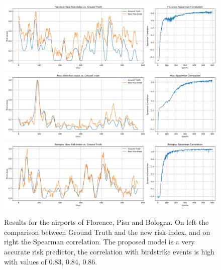 \begin{figure}
	\centering
	\includegraphics[width=14cm]{img/FI.png}	\includegraphics[width=14cm]{img/PSA.png}
	\includegraphics[width=14cm]{img/BO.png}
	\caption{Results for the airports of Florence, Pisa and Bologna. On left the comparison between Ground Truth and the new risk-index, and on right the Spearman correlation. The proposed model is a very accurate risk predictor, the correlation with birdstrike events is high with values of 0.83, 0.84, 0.86.}
	\label{FI_PSA_BO_results}
\end{figure}

